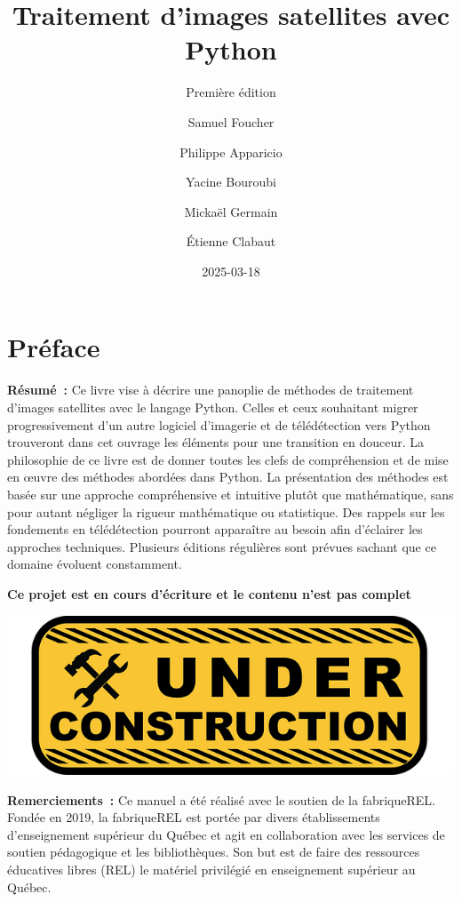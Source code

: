 \documentclass[
  11pt,
  letterpaper,
  open=any,
  twoside=false,
  french]{scrbook}
\title{Traitement d'images satellites avec Python}
\subtitle{Première édition}
\author{Samuel Foucher \and Philippe Apparicio \and Yacine
Bouroubi \and Mickaël Germain \and Étienne Clabaut}
\date{2025-03-18}
\renewcommand*\contentsname{Table des matières}
\newcommand\contentsname{Table des matières}
\begin{document}
\frontmatter
\maketitle

\renewcommand*\contentsname{Table des matières}
{
\hypersetup{linkcolor=}
\setcounter{tocdepth}{2}
\tableofcontents
}
\listoffigures
\listoftables

\mainmatter
{}

\chapter*{Préface}\label{pruxe9face}


\renewcommand{\partname}{} %

\textbf{Résumé~:} Ce livre vise à décrire une panoplie de méthodes de
traitement d'images satellites avec le langage Python. Celles et ceux
souhaitant migrer progressivement d'un autre logiciel d'imagerie et de
télédétection vers Python trouveront dans cet ouvrage les éléments pour
une transition en douceur. La philosophie de ce livre est de donner
toutes les clefs de compréhension et de mise en œuvre des méthodes
abordées dans Python. La présentation des méthodes est basée sur une
approche compréhensive et intuitive plutôt que mathématique, sans pour
autant négliger la rigueur mathématique ou statistique. Des rappels sur
les fondements en télédétection pourront apparaître au besoin afin
d'éclairer les approches techniques. Plusieurs éditions régulières sont
prévues sachant que ce domaine évoluent constamment.

\textbf{Ce projet est en cours d'écriture et le contenu n'est pas
complet}

\includegraphics[width=0.5\linewidth,height=\textheight,keepaspectratio]{images/logos/under-construction-2408062_640.png}\hfill

\textbf{Remerciements~:} Ce manuel a été réalisé avec le soutien de la
fabriqueREL. Fondée en 2019, la fabriqueREL est portée par divers
établissements d'enseignement supérieur du Québec et agit en
collaboration avec les services de soutien pédagogique et les
bibliothèques. Son but est de faire des ressources éducatives libres
(REL) le matériel privilégié en enseignement supérieur au Québec.
\end{document}
